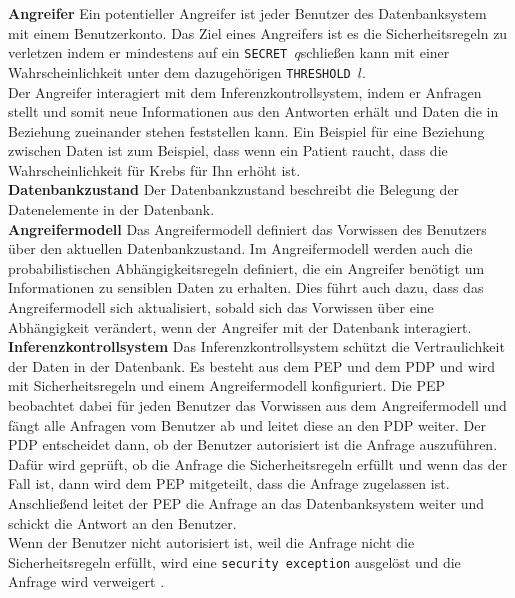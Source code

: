 \documentclass[german,version-2020-11]{uzl-thesis}
\begin{document}
\textbf{Angreifer} Ein potentieller Angreifer ist jeder Benutzer des Datenbanksystem mit einem Benutzerkonto. Das Ziel eines Angreifers ist es die Sicherheitsregeln zu verletzen indem er mindestens auf ein \texttt{SECRET $q$}schließen kann mit einer Wahrscheinlichkeit unter dem dazugehörigen \texttt{THRESHOLD $l$}. \\ Der Angreifer interagiert mit dem Inferenzkontrollsystem, indem er Anfragen stellt und somit neue Informationen aus den Antworten erhält und Daten die in Beziehung zueinander stehen feststellen kann. Ein Beispiel für eine Beziehung zwischen Daten ist zum Beispiel, dass wenn ein Patient raucht, dass die Wahrscheinlichkeit für Krebs für Ihn erhöht ist.  \\
\textbf{Datenbankzustand} Der Datenbankzustand beschreibt die Belegung der Datenelemente in der Datenbank. \\
\textbf{Angreifermodell} Das Angreifermodell definiert das Vorwissen des Benutzers über den aktuellen Datenbankzustand. Im Angreifermodell werden auch die probabilistischen Abhängigkeitsregeln definiert, die ein Angreifer benötigt um Informationen zu sensiblen Daten zu erhalten. Dies führt auch dazu, dass das Angreifermodell sich aktualisiert, sobald sich das Vorwissen über eine Abhängigkeit verändert, wenn der Angreifer mit der Datenbank interagiert.\\ 
\textbf{Inferenzkontrollsystem} Das Inferenzkontrollsystem schützt die Vertraulichkeit der Daten in der Datenbank. Es besteht aus dem PEP und dem PDP und wird mit Sicherheitsregeln und einem Angreifermodell konfiguriert. Die PEP beobachtet dabei für jeden Benutzer das Vorwissen aus dem Angreifermodell und fängt alle Anfragen vom Benutzer ab und leitet diese an den PDP weiter. Der PDP entscheidet dann, ob der Benutzer autorisiert ist die Anfrage auszuführen. Dafür wird geprüft, ob die Anfrage die Sicherheitsregeln erfüllt und wenn das der Fall ist, dann wird dem PEP mitgeteilt, dass die Anfrage zugelassen ist. Anschließend leitet der PEP die Anfrage an das Datenbanksystem weiter und schickt die Antwort an den Benutzer. \\  Wenn der Benutzer nicht autorisiert ist, weil die Anfrage nicht die Sicherheitsregeln erfüllt, wird eine \texttt{security exception} ausgelöst und die Anfrage wird verweigert \cite{6}.
\end{document}
